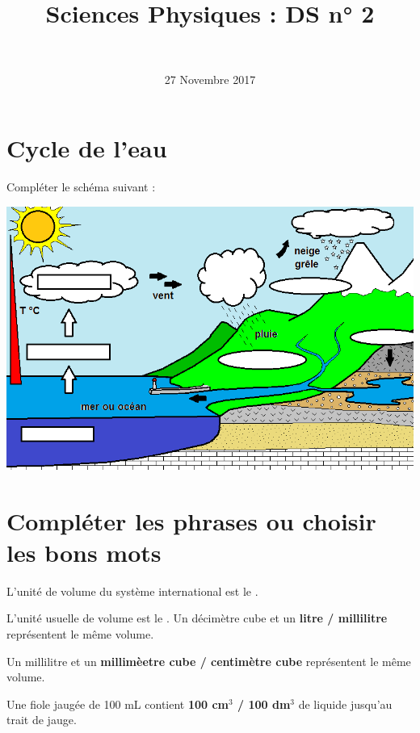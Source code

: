 \documentclass[a4paper,11pt]{exam}
\author{\ }
\date{27 Novembre 2017}
\title{Sciences Physiques : DS n° 2}
\begin{document}
%	

	\maketitle
\vspace*{-0.5cm}	
\section{Cycle de l'eau}

Compléter le schéma suivant :

\begin{center}
	\includegraphics[scale=0.6]{cycle_eau}
\end{center}

\section{Compléter les phrases ou choisir les bons mots}

\begin{questions}
	\question L'unité de volume du système international est le \fillin .
	
	\question L'unité usuelle de volume est le \fillin .
	\question Un décimètre cube et un \textbf{litre / millilitre} représentent le même volume.
	
	\question Un millilitre et un \textbf{millimèetre cube / centimètre cube} représentent le même volume.
	
	\question Une fiole jaugée de 100 mL contient \textbf{100 cm$^3$ / 100 dm$^3$} de liquide jusqu'au trait de jauge.
\end{questions}
\end{document}
